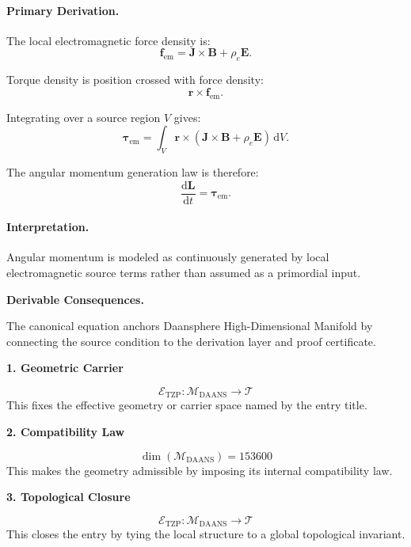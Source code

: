 \paragraph{Primary Derivation.}
The local electromagnetic force density is:
\begin{equation}
\mathbf{f}_{\mathrm{em}}
=
\mathbf{J}\times\mathbf{B}
+
\rho_e\mathbf{E}.
\end{equation}

Torque density is position crossed with force density:
\begin{equation}
\mathbf{r}\times\mathbf{f}_{\mathrm{em}}.
\end{equation}

Integrating over a source region $V$ gives:
\begin{equation}
\boldsymbol{\tau}_{\mathrm{em}}
=
\int_V
\mathbf{r}\times
\left(
\mathbf{J}\times\mathbf{B}
+
\rho_e\mathbf{E}
\right)
\,\mathrm{d}V .
\end{equation}

The angular momentum generation law is therefore:
\begin{equation}
\boxed{
\frac{\mathrm{d}\mathbf{L}}{\mathrm{d}t}
=
\boldsymbol{\tau}_{\mathrm{em}} .
}
\end{equation}

\paragraph{Interpretation.}
Angular momentum is modeled as continuously generated by local electromagnetic source terms rather than assumed as a primordial input.

\par\vspace{0.35em}
\noindent\textbf{Derivable Consequences.}\quad
\begingroup
\footnotesize
\raggedright
The canonical equation anchors Daansphere High-Dimensional Manifold by connecting the source condition to the derivation layer and proof certificate.
\par\endgroup

\noindent\textbf{1. Geometric Carrier}\par
\[
\mathcal{E}_{\mathrm{TZP}}:\mathcal{M}_{\mathrm{DAANS}}\to\mathcal{T}
\]
\noindent This fixes the effective geometry or carrier space named by the entry title.\par
\noindent\textbf{2. Compatibility Law}\par
\[
\dim(\mathcal{M}_{\mathrm{DAANS}})=153600
\]
\noindent This makes the geometry admissible by imposing its internal compatibility law.\par
\noindent\textbf{3. Topological Closure}\par
\[
\mathcal{E}_{\mathrm{TZP}}:\mathcal{M}_{\mathrm{DAANS}}\to\mathcal{T}
\]
\noindent This closes the entry by tying the local structure to a global topological invariant.\par

